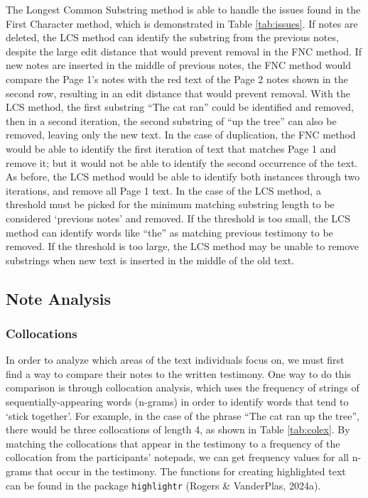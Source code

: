 \documentclass[print]{nuthesis}
\begin{document}
The Longest Common Substring method is able to handle the issues found in the First  Character method, which is demonstrated in Table \ref{tab:issues}.
If notes are deleted, the LCS method can identify the substring from the previous notes, despite the large edit distance that would prevent removal in the FNC method.
If new notes are inserted in the middle of previous notes, the FNC method would compare the Page 1's notes with the red text of the Page 2 notes shown in the second row, resulting in an edit distance that would prevent removal.
With the LCS method, the first substring ``The cat ran'' could be identified and removed, then in a second iteration, the second substring of ``up the tree'' can also be removed, leaving only the new text.
In the case of duplication, the FNC method would be able to identify the first iteration of text that matches Page 1 and remove it; but it would not be able to identify the second occurrence of the text.
As before, the LCS method would be able to identify both instances through two iterations, and remove all Page 1 text.
In the case of the LCS method, a threshold must be picked for the minimum matching substring length to be considered `previous notes' and removed.
If the threshold is too small, the LCS method can identify words like ``the'' as matching previous testimony to be removed.
If the threshold is too large, the LCS method may be unable to remove substrings when new text is inserted in the middle of the old text.

\hypertarget{note-analysis}{%
\subsection{Note Analysis}\label{note-analysis}}

\hypertarget{collocations}{%
\subsubsection{Collocations}\label{collocations}}

In order to analyze which areas of the text individuals focus on, we must first find a way to compare their notes to the written testimony.
One way to do this comparison is through collocation analysis, which uses the frequency of strings of sequentially-appearing words (n-grams) in order to identify words that tend to `stick together'.
For example, in the case of the phrase ``The cat ran up the tree'', there would be three collocations of length 4, as shown in Table \ref{tab:colex}.
By matching the collocations that appear in the testimony to a frequency of the collocation from the participants' notepads, we can get frequency values for all n-grams that occur in the testimony.
The functions for creating highlighted text can be found in the package \texttt{highlightr} (Rogers \& VanderPlas, 2024a).
\end{document}
